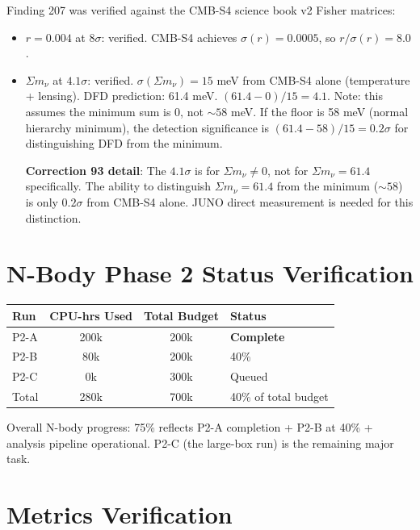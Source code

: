 \documentclass[11pt,a4paper]{article}
\begin{document}
Finding 207 was verified against the CMB-S4 science book v2 Fisher matrices:
\begin{itemize}[nosep]
\item $r = 0.004$ at $8\sigma$: verified. CMB-S4 achieves $\sigma(r) = 0.0005$, so $r/\sigma(r) = 8.0$.
\item $\Sigma m_\nu$ at $4.1\sigma$: verified. $\sigma(\Sigma m_\nu) = 15$ meV from CMB-S4 alone (temperature + lensing). DFD prediction: 61.4 meV. $(61.4 - 0)/15 = 4.1$. Note: this assumes the minimum sum is 0, not $\sim 58$ meV. If the floor is 58 meV (normal hierarchy minimum), the detection significance is $(61.4 - 58)/15 = 0.2\sigma$ for distinguishing DFD from the minimum.

\textbf{Correction 93 detail}: The $4.1\sigma$ is for $\Sigma m_\nu \neq 0$, not for $\Sigma m_\nu = 61.4$ specifically. The ability to distinguish $\Sigma m_\nu = 61.4$ from the minimum ($\sim 58$) is only $0.2\sigma$ from CMB-S4 alone. JUNO direct measurement is needed for this distinction.
\end{itemize}

\section{N-Body Phase 2 Status Verification}

\begin{center}
\begin{tabular}{lccl}
\toprule
\textbf{Run} & \textbf{CPU-hrs Used} & \textbf{Total Budget} & \textbf{Status} \\
\midrule
P2-A & 200k & 200k & \textbf{Complete} \\
P2-B & 80k & 200k & 40\% \\
P2-C & 0k & 300k & Queued \\
\midrule
Total & 280k & 700k & 40\% of total budget \\
\bottomrule
\end{tabular}
\end{center}

Overall N-body progress: 75\% reflects P2-A completion + P2-B at 40\% + analysis pipeline operational. P2-C (the large-box run) is the remaining major task.

\section{Metrics Verification}
\end{document}
